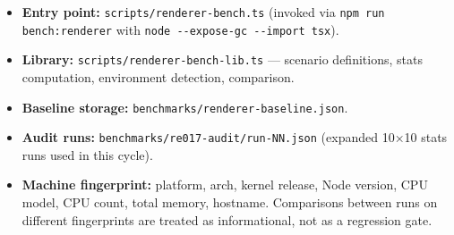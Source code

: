 \begin{itemize}
\tightlist
\item
  \textbf{Entry point:} \texttt{s\allowbreak{}c\allowbreak{}r\allowbreak{}i\allowbreak{}p\allowbreak{}t\allowbreak{}s\allowbreak{}/\allowbreak{}r\allowbreak{}e\allowbreak{}n\allowbreak{}d\allowbreak{}e\allowbreak{}r\allowbreak{}e\allowbreak{}r\allowbreak{}-\allowbreak{}b\allowbreak{}e\allowbreak{}n\allowbreak{}c\allowbreak{}h\allowbreak{}.\allowbreak{}t\allowbreak{}s} (invoked via \texttt{n\allowbreak{}p\allowbreak{}m\allowbreak{} \allowbreak{}r\allowbreak{}u\allowbreak{}n\allowbreak{} \allowbreak{}b\allowbreak{}e\allowbreak{}n\allowbreak{}c\allowbreak{}h\allowbreak{}:\allowbreak{}r\allowbreak{}e\allowbreak{}n\allowbreak{}d\allowbreak{}e\allowbreak{}r\allowbreak{}e\allowbreak{}r} with \texttt{n\allowbreak{}o\allowbreak{}d\allowbreak{}e\allowbreak{} \allowbreak{}-\allowbreak{}-\allowbreak{}e\allowbreak{}x\allowbreak{}p\allowbreak{}o\allowbreak{}s\allowbreak{}e\allowbreak{}-\allowbreak{}g\allowbreak{}c\allowbreak{} \allowbreak{}-\allowbreak{}-\allowbreak{}i\allowbreak{}m\allowbreak{}p\allowbreak{}o\allowbreak{}r\allowbreak{}t\allowbreak{} \allowbreak{}t\allowbreak{}s\allowbreak{}x}).
\item
  \textbf{Library:} \texttt{s\allowbreak{}c\allowbreak{}r\allowbreak{}i\allowbreak{}p\allowbreak{}t\allowbreak{}s\allowbreak{}/\allowbreak{}r\allowbreak{}e\allowbreak{}n\allowbreak{}d\allowbreak{}e\allowbreak{}r\allowbreak{}e\allowbreak{}r\allowbreak{}-\allowbreak{}b\allowbreak{}e\allowbreak{}n\allowbreak{}c\allowbreak{}h\allowbreak{}-\allowbreak{}l\allowbreak{}i\allowbreak{}b\allowbreak{}.\allowbreak{}t\allowbreak{}s} --- scenario definitions, stats computation, environment detection, comparison.
\item
  \textbf{Baseline storage:} \texttt{b\allowbreak{}e\allowbreak{}n\allowbreak{}c\allowbreak{}h\allowbreak{}m\allowbreak{}a\allowbreak{}r\allowbreak{}k\allowbreak{}s\allowbreak{}/\allowbreak{}r\allowbreak{}e\allowbreak{}n\allowbreak{}d\allowbreak{}e\allowbreak{}r\allowbreak{}e\allowbreak{}r\allowbreak{}-\allowbreak{}b\allowbreak{}a\allowbreak{}s\allowbreak{}e\allowbreak{}l\allowbreak{}i\allowbreak{}n\allowbreak{}e\allowbreak{}.\allowbreak{}j\allowbreak{}s\allowbreak{}o\allowbreak{}n}.
\item
  \textbf{Audit runs:} \texttt{b\allowbreak{}e\allowbreak{}n\allowbreak{}c\allowbreak{}h\allowbreak{}m\allowbreak{}a\allowbreak{}r\allowbreak{}k\allowbreak{}s\allowbreak{}/\allowbreak{}r\allowbreak{}e\allowbreak{}0\allowbreak{}1\allowbreak{}7\allowbreak{}-\allowbreak{}a\allowbreak{}u\allowbreak{}d\allowbreak{}i\allowbreak{}t\allowbreak{}/\allowbreak{}r\allowbreak{}u\allowbreak{}n\allowbreak{}-\allowbreak{}N\allowbreak{}N\allowbreak{}.\allowbreak{}j\allowbreak{}s\allowbreak{}o\allowbreak{}n} (expanded 10×10 stats runs used in this cycle).
\item
  \textbf{Machine fingerprint:} platform, arch, kernel release, Node version, CPU model, CPU count, total memory, hostname. Comparisons between runs on different fingerprints are treated as informational, not as a regression gate.
\end{itemize}

